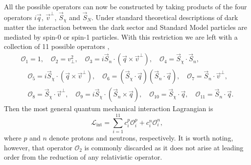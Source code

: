 All the possible operators can now be constructed by taking products of the four operators $i\vec{q}$, $\vec{v}^\perp$, $\vec{S}_\chi$ and $\vec{S}_N$. Under standard theoretical descriptions of dark matter the interaction between the dark sector and Standard Model particles are mediated by spin-0 or spin-1 particles. With this restriction we are left with a collection of 11 possible operators \parencite{FitzpatrickEtAl2013},
\begin{gather*}
    \mathcal{O}_1=1,\quad\mathcal{O}_2=v_\perp^2,\quad\mathcal{O}_3=i\vec{S}_n\cdot(\vec{q}\times\vec{v}^\perp),\quad\mathcal{O}_4=\vec{S}_\chi\cdot\vec{S}_n,\\
    \quad\mathcal{O}_5=i\vec{S}_\chi\cdot(\vec{q}\times\vec{v}^\perp),\quad\mathcal{O}_6=(\vec{S}_\chi\cdot\vec{q})(\vec{S}_n\cdot\vec{q}),\quad\mathcal{O}_7=\vec{S}_n\cdot\vec{v}^\perp,\\
    \quad\mathcal{O}_8=\vec{S}_\chi\cdot\vec{v}^\perp,\quad\mathcal{O}_9=i\vec{S}_\chi\cdot(\vec{S}_n\times\vec{q}),\quad\mathcal{O}_{10}=\vec{S}_\chi\cdot\vec{q},\quad\mathcal{O}_{11}=\vec{S}_n\cdot\vec{q}.
\end{gather*}
Then the most general quantum mechanical interaction Lagrangian is
\begin{equation}
    \mathcal{L}_\text{int}=\sum_{i=1}^{11}c_i^p\mathcal{O}_i^p+c_i^n\mathcal{O}_i^n,
\end{equation}
where $p$ and $n$ denote protons and neutrons, respectively. It is worth noting, however, that operator $\mathcal{O}_2$ is commonly discarded as it does not arise at leading order from the reduction of any relativistic operator.


